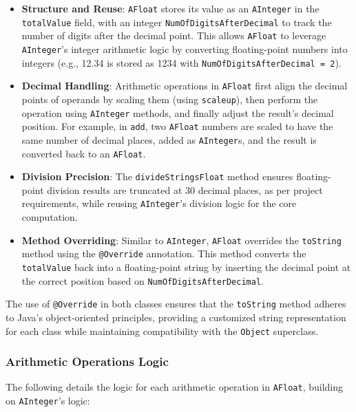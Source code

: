 \documentclass[a4paper,12pt]{article}
\begin{document}
\begin{itemize}
    \item \textbf{Structure and Reuse}: \texttt{AFloat} stores its value as an \texttt{AInteger} in the \texttt{totalValue} field, with an integer \texttt{NumOfDigitsAfterDecimal} to track the number of digits after the decimal point. This allows \texttt{AFloat} to leverage \texttt{AInteger}'s integer arithmetic logic by converting floating-point numbers into integers (e.g., 12.34 is stored as 1234 with \texttt{NumOfDigitsAfterDecimal = 2}).
    \item \textbf{Decimal Handling}: Arithmetic operations in \texttt{AFloat} first align the decimal points of operands by scaling them (using \texttt{scaleup}), then perform the operation using \texttt{AInteger} methods, and finally adjust the result's decimal position. For example, in \texttt{add}, two \texttt{AFloat} numbers are scaled to have the same number of decimal places, added as \texttt{AInteger}s, and the result is converted back to an \texttt{AFloat}.
    \item \textbf{Division Precision}: The \texttt{divideStringsFloat} method ensures floating-point division results are truncated at 30 decimal places, as per project requirements, while reusing \texttt{AInteger}'s division logic for the core computation.
    \item \textbf{Method Overriding}: Similar to \texttt{AInteger}, \texttt{AFloat} overrides the \texttt{toString} method using the \texttt{@Override} annotation. This method converts the \texttt{totalValue} back into a floating-point string by inserting the decimal point at the correct position based on \texttt{NumOfDigitsAfterDecimal}.
\end{itemize}

The use of \texttt{@Override} in both classes ensures that the \texttt{toString} method adheres to Java's object-oriented principles, providing a customized string representation for each class while maintaining compatibility with the \texttt{Object} superclass.

\subsubsection{Arithmetic Operations Logic}
The following details the logic for each arithmetic operation in \texttt{AFloat}, building on \texttt{AInteger}'s logic:
\end{document}
